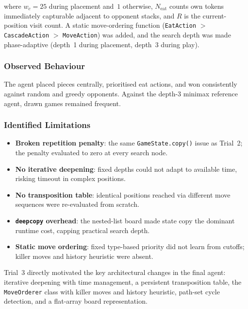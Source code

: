 \documentclass[10.5pt,a4paper]{article}
\begin{document}
where $w_c = 25$ during placement and~$1$ otherwise, $N_{\text{eat}}$ counts own tokens immediately capturable adjacent to opponent stacks, and $R$ is the current-position visit count. A static move-ordering function (\texttt{EatAction} $>$ \texttt{CascadeAction} $>$ \texttt{MoveAction}) was added, and the search depth was made phase-adaptive (depth~1 during placement, depth~3 during play).

\subsubsection{Observed Behaviour}

The agent placed pieces centrally, prioritised eat actions, and won consistently against random and greedy opponents. Against the depth-3 minimax reference agent, drawn games remained frequent.

\subsubsection{Identified Limitations}

\begin{itemize}[noitemsep]
    \item \textbf{Broken repetition penalty}: the same \texttt{GameState.copy()} issue as Trial~2; the penalty evaluated to zero at every search node.
    \item \textbf{No iterative deepening}: fixed depths could not adapt to available time, risking timeout in complex positions.
    \item \textbf{No transposition table}: identical positions reached via different move sequences were re-evaluated from scratch.
    \item \textbf{\texttt{deepcopy} overhead}: the nested-list board made state copy the dominant runtime cost, capping practical search depth.
    \item \textbf{Static move ordering}: fixed type-based priority did not learn from cutoffs; killer moves and history heuristic were absent.
\end{itemize}

Trial~3 directly motivated the key architectural changes in the final agent: iterative deepening with time management, a persistent transposition table, the \texttt{MoveOrderer} class with killer moves and history heuristic, path-set cycle detection, and a flat-array board representation.

\end{document}
